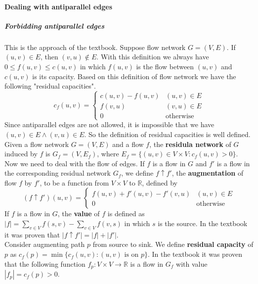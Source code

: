 \documentclass{book}
\begin{document}
	\paragraph{Dealing with antiparallel edges}
	\subparagraph{Forbidding antiparallel edges}
	This is the approach of the textbook. Suppose flow network $G = (V, E)$. If $(u, v) \in E$, then $(v, u) \not\in E$. With this definition we always have $0 \le f(u, v) \le c(u, v)$ in which $f(u, v)$ is the flow between $(u, v)$ and $c(u, v)$ is its capacity. Based on this definition of flow network we have the following "residual capacities".
	\begin{equation}
	\label{eq:ResidualCapacityNoAntiParallel}
	c_f(u, v) = \begin{cases}
	c(u, v) - f(u, v) & (u, v) \in E \\
	f(v, u) & (v, u) \in E \\
	0 & \text{otherwise}
	\end{cases}
	\end{equation}
	Since antiparallel edges are not allowed, it is impossible that we have $(u, v) \in E \land (v, u) \in E$. So the definition of residual capacities is well defined. Given a flow network $G = (V, E)$ and a flow $f$, the \textbf{residula network} of $G$ induced by $f$ is $G_f = (V, E_f)$, where $E_f = \{(u, v) \in V \times V : c_f(u, v) > 0\}$.\\
	Now we need to deal with the flow of edges. If $f$ is a flow in $G$ and $f'$ is a flow in the corresponding residual network $G_f$, we define $f \uparrow f'$, the \textbf{augmentation} of flow $f$ by $f'$, to be a function from $V \times V$ to $\mathbb{R}$, defined by
	\begin{equation}
	\label{eq:augmentationOfFlowNoAntiparallel}
		(f \uparrow f')(u, v) = \begin{cases}
		f(u, v) + f'(u, v) - f'(v, u) & (u, v) \in E \\
		0 & \text{otherwise}
		\end{cases}
	\end{equation}
	If $f$ is a flow in $G$, the \textbf{value} of $f$ is defined as $|f| = \sum_{v \in V}f(s, v) - \sum_{v \in V}f(v, s)$ in which $s$ is the source. In the textbook it was proven that $|f \uparrow f'| = |f| + |f'|$.\\
	Consider augmenting path $p$ from source to sink. We define \textbf{residual capacity} of $p$ as $c_f(p) = \min\{c_f(u, v) : (u, v) \text{ is on } p\}$. In the textbook it was proven that the following function $f_p : V \times V \rightarrow \mathbb{R}$ is a flow in $G_f$ with value $|f_p| = c_f(p) > 0$.
\end{document}
